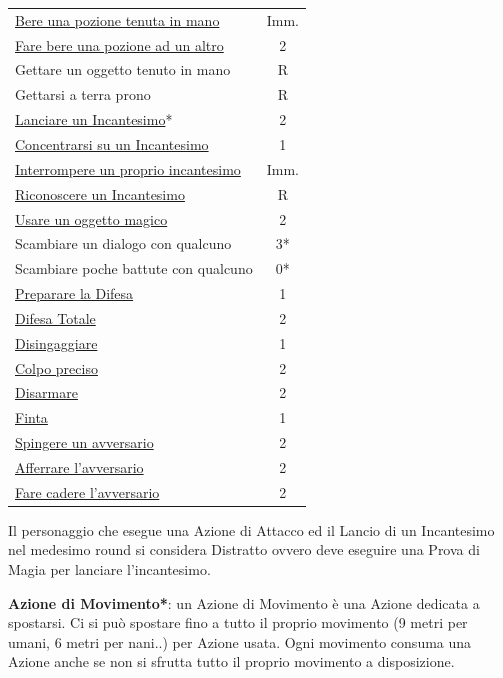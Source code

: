 \begin{multicols}{2}
\begin{tabular}{lc}
\midrule
\hyperlink{insorgenzaveleno}{Bere una pozione tenuta in mano}& Imm.\\
\hyperlink{insorgenzaveleno}{Fare bere una pozione ad un altro} & 2\\
\midrule
Gettare un oggetto tenuto in mano& R\\
Gettarsi a terra prono& R\\
\midrule
\hyperlink{magietempodilancio}{Lanciare un Incantesimo}*& 2\\
\hyperlink{magieconcentrazione}{Concentrarsi su un Incantesimo}& 1\\
\hyperlink{magiedurata}{Interrompere un proprio incantesimo} & Imm.\\
\hyperlink{riconoscereincantesimo}{Riconoscere un Incantesimo}& R\\
\hyperlink{regoleoggettimagici}{Usare un oggetto magico}& 2\\
\midrule
Scambiare un dialogo con qualcuno& 3*\\
Scambiare poche battute con qualcuno& 0*\\
\midrule
\hyperlink{preparareladifesa}{Preparare la Difesa} & 1\\
\hyperlink{difesatotale}{Difesa Totale} & 2\\
\hyperlink{disingaggiare}{Disingaggiare} & 1\\
\hyperlink{colpopreciso}{Colpo preciso} & 2\\
\midrule
\hyperlink{disarmare}{Disarmare} & 2\\
\hyperlink{finta}{Finta} & 1\\
\hyperlink{spingereavversario}{Spingere un avversario} & 2\\
\hyperlink{afferrareunavversario}{Afferrare l'avversario} & 2\\
\hyperlink{farecadereavversario}{Fare cadere l'avversario} & 2
\end{tabular}

\medskip

Il personaggio che esegue una Azione di Attacco ed il Lancio di un Incantesimo nel medesimo round si considera Distratto ovvero deve eseguire una Prova di Magia per lanciare l'incantesimo.

\textbf{Azione di Movimento*}: un Azione di Movimento è una Azione dedicata a spostarsi. Ci si può spostare fino a tutto il proprio movimento (9 metri per umani, 6 metri per nani..) per Azione usata. Ogni movimento consuma una Azione anche se non si sfrutta tutto il proprio movimento a disposizione.


\end{multicols}
